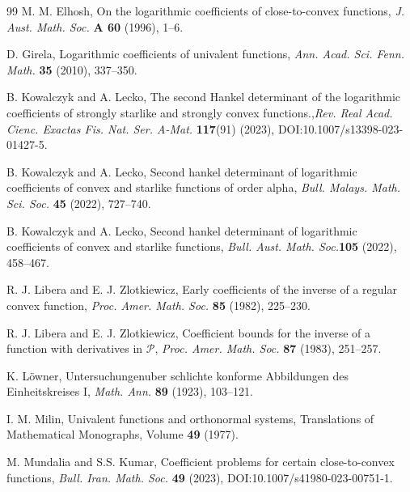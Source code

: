 \documentclass[a4paper,12pt]{amsart}
\theoremstyle{definition}
\numberwithin{equation}{section}
\begin{document}
\begin{thebibliography}{99}
%	
	{\sc M. M. Elhosh}, On the logarithmic coefficients of close-to-convex functions, {\it J. Aust. Math. Soc.} {\bf A 60} (1996), 1--6.
	
	{\sc D. Girela}, Logarithmic coefficients of univalent functions, {\it Ann. Acad. Sci. Fenn. Math.} {\bf 35} (2010), 337--350.
	
	{\sc B. Kowalczyk} and {\sc A. Lecko}, The second Hankel determinant of the logarithmic coefficients of strongly starlike and strongly convex functions.,{\it Rev. Real Acad. Cienc. Exactas Fis. Nat. Ser. A-Mat.} {\bf 117}(91) (2023), DOI:10.1007/s13398-023-01427-5.
	
	{\sc B. Kowalczyk} and {\sc A. Lecko}, Second hankel determinant of logarithmic coefficients of convex and starlike functions of order alpha, {\it Bull. Malays. Math. Sci. Soc.} {\bf 45} (2022), 727--740.
	
	{\sc B. Kowalczyk} and {\sc A. Lecko}, Second hankel determinant of logarithmic coefficients of convex and starlike functions, {\it Bull. Aust. Math. Soc.}{\bf 105} (2022), 458--467.
	
 {\sc R. J. Libera} and {\sc E. J. Zlotkiewicz}, Early coefficients of the inverse of a regular convex function, {\it Proc. Amer. Math. Soc.} {\bf 85} (1982), 225--230.

 {\sc R. J. Libera} and {\sc E. J. Zlotkiewicz}, Coefficient bounds for the inverse of a function with derivatives in $\mathcal{P}$, {\it Proc. Amer. Math. Soc.} {\bf 87} (1983), 251--257.	
	
	
	{\sc K. L\"{o}wner}, Untersuchungenuber schlichte konforme Abbildungen des Einheitskreises I, {\it Math. Ann.} {\bf 89} (1923), 103--121.
	
	
	
	{\sc I. M. Milin}, Univalent functions and orthonormal systems, Translations of Mathematical Monographs, Volume {\bf 49} (1977).
	
	{\sc M. Mundalia} and {\sc S.S. Kumar}, Coefficient problems for certain close-to-convex functions, {\it Bull. Iran. Math. Soc.} {\bf 49} (2023), DOI:10.1007/s41980-023-00751-1.
		
	
	

\end{thebibliography}
\end{document}
